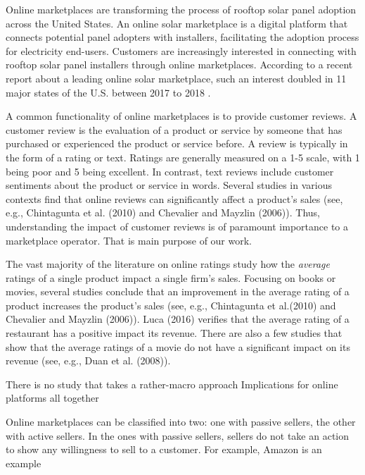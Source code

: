 \documentclass[msom,blindrev]{informs3}
\begin{document}
Online marketplaces are transforming the process of rooftop solar panel adoption across the United States. An online solar marketplace is a digital platform that connects potential panel adopters with installers, facilitating the adoption process for electricity end-users. Customers are increasingly interested in connecting with rooftop solar panel installers through online marketplaces. According to a recent report about a leading online solar marketplace, such an interest doubled in 11 major states of the U.S. between 2017 to 2018 \citep{energysageintel19}.



A common functionality of online marketplaces is to provide customer reviews. A customer review is the evaluation of a product or service by someone that has purchased or experienced the product or service before. A review is typically in the form of a rating or text. Ratings are generally measured on a 1-5 scale, with 1 being poor and 5 being excellent. In contrast, text reviews include customer sentiments about the product or service in words. Several studies in various contexts find that online reviews can significantly affect a product's sales (see, e.g., Chintagunta et al. (2010) and Chevalier and Mayzlin (2006)). Thus, understanding the impact of customer reviews is of paramount importance to a marketplace operator. That is main purpose of our work.

The vast majority of the literature on online ratings study how the \emph{average} ratings of a single product impact a single firm's sales. Focusing on books or movies, several studies conclude that an improvement in the average rating of a product increases the product's sales (see, e.g., Chintagunta et al.(2010) and Chevalier and Mayzlin (2006)). Luca (2016) verifies that the average rating of a restaurant has a positive impact its revenue. There are also a few studies that show that the average ratings of a movie do not have a significant impact on its revenue (see, e.g., Duan et al. (2008)). 

There is no study that takes a rather-macro approach Implications for online platforms all together 

Online marketplaces can be classified into two: one with passive sellers, the other with active sellers. In the ones with passive sellers, sellers do not take an action to show any willingness to sell to a customer. For example, Amazon is an example
\end{document}
